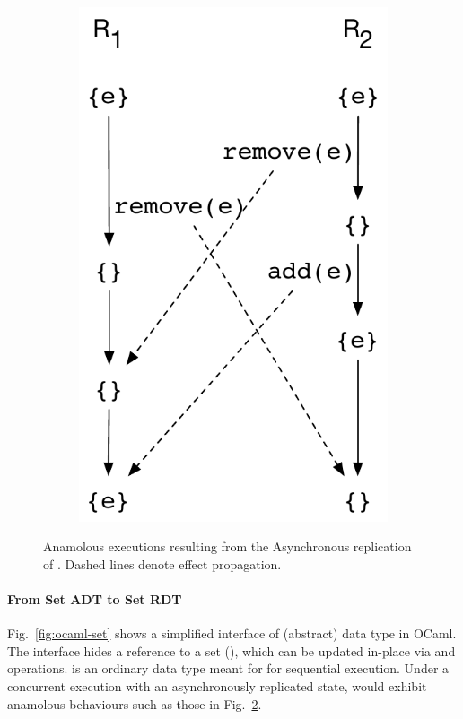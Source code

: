 \begin{figure}[ht]
\begin{subfigure}[t]{0.44\columnwidth}
    \includegraphics[scale=0.35]{Figures/crdt-execs-2}
    \caption{}
    \label{fig:crdt-execs-2}
  \end{subfigure}
\caption{Anamolous executions resulting from the Asynchronous
  replication of . Dashed lines denote effect propagation.}
\label{fig:crdt-execs}
\end{figure}

\noindent\paragraph{From Set ADT to Set RDT} Fig.~\ref{fig:ocaml-set}
shows a simplified interface of  (abstract) data type in OCaml.
The interface hides a reference to a set (), which can be
updated in-place via  and  operations.  is an
ordinary data type meant for for sequential execution. Under a
concurrent execution with an asynchronously replicated state, 
would exhibit anamolous behaviours such as those in
Fig.~\ref{fig:crdt-execs}.


